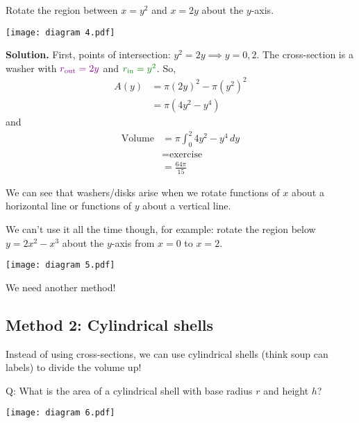 \begin{Example}{}{}
    Rotate the region between $ x=y^2 $ and $ x=2y $ about the $ y $-axis.

    \begin{center}
        \texttt{[image: diagram 4.pdf]}
    \end{center}

    \textbf{Solution.} First, points of intersection: $ y^2=2y\implies y=0,2 $.
    The cross-section is a washer with $ \color[rgb]{0.5,0,0.5} r_{\text{out}}=2y $ and
    $ \color[rgb]{0,0.5,0}  r_{\text{in}}=y^2 $. So,
    \begin{align*}
        A(y)
         & =\pi\left(2y\right)^2-\pi\left(y^2\right)^2 \\
         & =\pi\left( 4y^2-y^4 \right)
    \end{align*}
    and
    \begin{align*}
        \text{Volume}
         & =\pi \int_{0}^{2} 4y^2-y^4\, d{y} \\
         & =\text{exercise}                  \\
         & =\frac{64\pi}{15}
    \end{align*}
\end{Example}

We can see that washers/disks arise when we rotate functions of $ x $ about
a horizontal line or functions of $ y $ about a vertical line.

We can't use it all the time though, for example: rotate the region below
$ y=2x^2-x^3 $ about the $ y $-axis from $ x=0 $ to $ x=2 $.

\begin{center}
    \texttt{[image: diagram 5.pdf]}
\end{center}

We need another method!

\subsection*{Method 2: Cylindrical shells}

Instead of using cross-sections, we can use cylindrical shells (think soup can labels)
to divide the volume up!

Q\@: What is the area of a cylindrical shell with base radius $ r $ and height $ h $?

\begin{center}
    \texttt{[image: diagram 6.pdf]}
\end{center}

